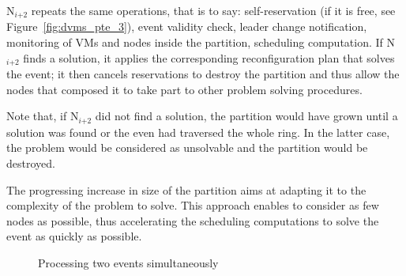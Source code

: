 N\(_{\textit{i+2}}\) repeats the same operations, that is to say: self-reservation
(if it is free, see Figure~\ref{fig:dvms_pte_3}), event validity check, leader
change notification, monitoring of VMs and nodes inside the partition,
scheduling computation.  If N\(_{\textit{i+2}}\) finds a solution, it applies the
corresponding reconfiguration plan that solves the event; it then cancels
reservations to destroy the partition and thus allow the nodes that composed it
to take part to other problem solving procedures.

Note that, if N\(_{\textit{i+2}}\) did not find a solution, the partition would
have grown until a solution was found or the even had traversed the whole ring.
In the latter case, the problem would be considered as unsolvable and the
partition would be destroyed.

The progressing increase in size of the partition aims at adapting it to the
complexity of the problem to solve.
This approach enables to consider as few nodes as possible, thus accelerating
the scheduling computations to solve the event as quickly as possible.

\begin{figure}[h]
%
%
%
%
\caption{Processing two events simultaneously\label{fig:dvms_pte}}
\end{figure}


